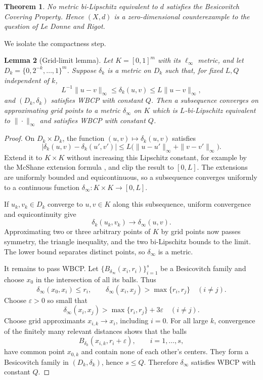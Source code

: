 \documentclass[11pt]{article}
\newtheorem{theorem}{Theorem}
\newtheorem{lemma}[theorem]{Lemma}
\begin{document}
\begin{theorem}\label{thm:main}
No metric bi-Lipschitz equivalent to $d$ satisfies the Besicovitch Covering
Property.  Hence $(X,d)$ is a zero-dimensional counterexample to the question
of Le Donne and Rigot.
\end{theorem}

We isolate the compactness step.

\begin{lemma}[Grid-limit lemma]\label{lem:gridlimit}
Let $K=[0,1]^m$ with its $\ell_\infty$ metric, and let
$D_k=\{0,2^{-k},\ldots,1\}^m$.  Suppose $\delta_k$ is a metric on $D_k$ such
that, for fixed $L,Q$ independent of $k$,
\[
 L^{-1}\|u-v\|_\infty\leq\delta_k(u,v)
 \leq L\|u-v\|_\infty,
\]
and $(D_k,\delta_k)$ satisfies WBCP with constant $Q$.  Then a subsequence
converges on approximating grid points to a metric $\delta_\infty$ on $K$
which is $L$-bi-Lipschitz equivalent to $\|\cdot\|_\infty$ and satisfies WBCP
with constant $Q$.
\end{lemma}

\begin{proof}
On $D_k\times D_k$, the function $(u,v)\mapsto\delta_k(u,v)$ satisfies
\[
 |\delta_k(u,v)-\delta_k(u',v')|
 \leq L\bigl(\|u-u'\|_\infty+\|v-v'\|_\infty\bigr).
\]
Extend it to $K\times K$ without increasing this Lipschitz constant, for
example by the McShane extension formula \cite{McShane}, and clip the result
to $[0,L]$.  The extensions are uniformly bounded and equicontinuous, so a
subsequence converges uniformly to a continuous function
$\delta_\infty:K\times K\to[0,L]$.

If $u_k,v_k\in D_k$ converge to $u,v\in K$ along this subsequence, uniform
convergence and equicontinuity give
\[
 \delta_k(u_k,v_k)\longrightarrow\delta_\infty(u,v).
\]
Approximating two or three arbitrary points of $K$ by grid points now passes
symmetry, the triangle inequality, and the two bi-Lipschitz bounds to the
limit.  The lower bound separates distinct points, so $\delta_\infty$ is a
metric.

It remains to pass WBCP.  Let
$\{B_{\delta_\infty}(x_i,r_i)\}_{i=1}^s$ be a Besicovitch family and choose
$x_0$ in the intersection of all its balls.  Thus
\[
 \delta_\infty(x_0,x_i)\leq r_i,
 \qquad
 \delta_\infty(x_i,x_j)>\max\{r_i,r_j\}\quad(i\ne j).
\]
Choose $\varepsilon>0$ so small that
\[
 \delta_\infty(x_i,x_j)>
 \max\{r_i,r_j\}+3\varepsilon\quad(i\ne j).
\]
Choose grid approximants $x_{i,k}\to x_i$, including $i=0$.  For all large
$k$, convergence of the finitely many relevant distances shows that the
balls
\[
 B_{\delta_k}(x_{i,k},r_i+\varepsilon),\qquad i=1,\ldots,s,
\]
have common point $x_{0,k}$ and contain none of each other's centers.  They
form a Besicovitch family in $(D_k,\delta_k)$, hence $s\leq Q$.  Therefore
$\delta_\infty$ satisfies WBCP with constant $Q$.
\end{proof}
\end{document}
